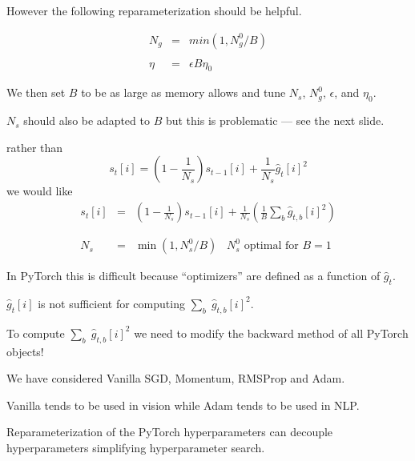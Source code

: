 {However the following reparameterization should be helpful.

\begin{eqnarray*}
N_g & = & min(1,N^0_g/B) \\
\\
\eta & = & \epsilon B \eta_0
\end{eqnarray*}

\vfill
We then set $B$ to be as large as memory allows and tune $N_s$, $N^0_g$, $\epsilon$, and $\eta_0$.

\vfill
$N_s$ should also be adapted to $B$ but this is problematic --- see the next slide.


rather than
$$s_t[i] = \left(1-\frac{1}{N_s}\right) s_{t-1}[i] + \frac{1}{N_s} \hat{g}_t[i]^2$$
\vfill
we would like
\begin{eqnarray*}
s_t[i] & = &  \left(1-\frac{1}{N_s}\right) s_{t-1}[i] + \frac{1}{N_s} \left(\frac{1}{B} \sum_b \hat{g}_{t,b}[i]^2\right) \\
\\
\\
N_s & = & \min\left(1,N^0_s/B\right)\;\;\;\mbox{$N^0_s$ optimal for $B=1$}
\end{eqnarray*}


In PyTorch this is difficult because ``optimizers'' are defined as a function of $\hat{g}_t$.

\vfill
$\hat{g}_t[i]$ is not sufficient for computing $\sum_b \;\hat{g}_{t,b}[i]^2$.


\vfill
To compute $\sum_b \;\hat{g}_{t,b}[i]^2$ we need to modify the backward method of all PyTorch objects!


We have considered Vanilla SGD, Momentum, RMSProp and Adam.

\vfill
Vanilla tends to be used in vision while Adam tends to be used in NLP.

\vfill
Reparameterization of the PyTorch hyperparameters can decouple hyperparameters simplifying hyperparameter search.



} 

